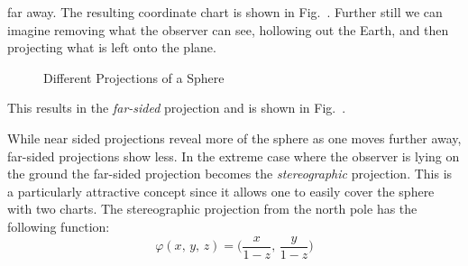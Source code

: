 \documentclass{book}                                                            %
\begin{document}
                far away. The resulting coordinate chart is shown in
                Fig.~. Further still we can imagine
                removing what the observer can see, hollowing out the Earth, and
                then projecting what is left onto the plane.
                \begin{figure}
                    \centering
                    \captionsetup{type=figure}
                    \begin{subfigure}[b]{0.49\textwidth}
                        \centering
                        \captionsetup{type=figure}
                        \label{fig:Near_Sided_Proj}
                    \end{subfigure}
                    \begin{subfigure}[b]{0.49\textwidth}
                        \centering
                        \captionsetup{type=figure}
                        \label{fig:Far_Sided_Proj}
                    \end{subfigure}
                    \caption{Different Projections of a Sphere}
                \end{figure}
                This results in the \textit{far-sided} projection and is shown
                in Fig.~.
                \par\vspace{1ex}
                \begin{minipage}[t]{0.52\textwidth}
                    While near sided projections reveal more of the sphere as
                    one moves further away, far-sided projections show less. In
                    the extreme case where the observer is lying on the ground
                    the far-sided projection becomes the \textit{stereographic}
                    projection. This is a particularly attractive concept since
                    it allows one to easily cover the sphere with two charts.
                    The stereographic projection from the north pole has the
                    following function:
                    \begin{equation}
                        \varphi(x,\,y,\,z)=\Big(\frac{x}{1-z},\,\frac{y}{1-z}\Big)
                    \end{equation}
                \end{minipage}
\end{document}
